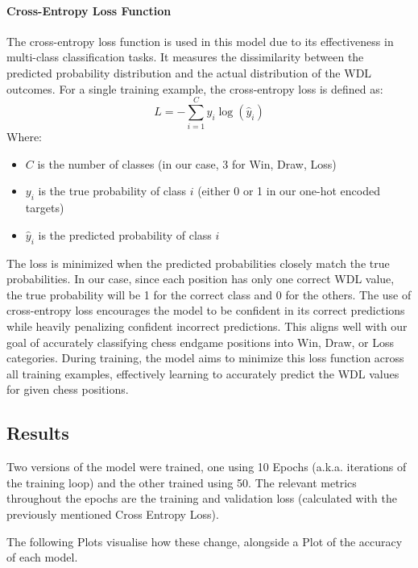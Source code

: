 \paragraph{Cross-Entropy Loss Function}
The cross-entropy loss function \cite{crossentropyloss} is used in this model due to its effectiveness in multi-class classification tasks. It measures the dissimilarity between the predicted probability distribution and the actual distribution of the WDL outcomes.
For a single training example, the cross-entropy loss is defined as:
\[
L = -\sum_{i=1}^{C} y_i \log(\hat{y}_i)
\]
Where:
\begin{itemize}
\item $C$ is the number of classes (in our case, 3 for Win, Draw, Loss)
\item $y_i$ is the true probability of class $i$ (either 0 or 1 in our one-hot encoded targets)
\item $\hat{y}_i$ is the predicted probability of class $i$
\end{itemize}
The loss is minimized when the predicted probabilities closely match the true probabilities. In our case, since each position has only one correct WDL value, the true probability will be 1 for the correct class and 0 for the others.
The use of cross-entropy loss encourages the model to be confident in its correct predictions while heavily penalizing confident incorrect predictions. This aligns well with our goal of accurately classifying chess endgame positions into Win, Draw, or Loss categories.
During training, the model aims to minimize this loss function across all training examples, effectively learning to accurately predict the WDL values for given chess positions.

\subsection{Results}
Two versions of the model were trained, one using 10 Epochs (a.k.a. iterations of the training loop) and the other trained using 50. The relevant metrics throughout the epochs are the training and validation loss (calculated with the previously mentioned Cross Entropy Loss).

The following Plots visualise how these change, alongside a Plot of the accuracy of each model.

